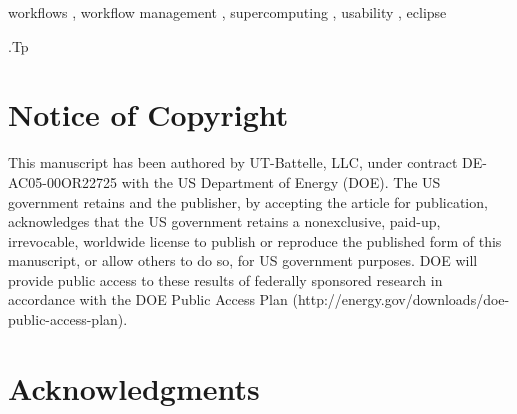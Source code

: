 \documentclass{elsart}
\begin{document}
\begin{frontmatter}
\begin{abstract}
\end{abstract}

\begin{keyword}
workflows
\sep 
workflow management
\sep
supercomputing
\sep
usability
\sep
eclipse

\vspace{1ex}

.Tp %

\end{keyword}

\end{frontmatter}

\section*{Notice of Copyright}

This manuscript has been authored by UT-Battelle, LLC, under contract
DE-AC05-00OR22725 with the US Department of Energy (DOE). The US government
retains and the publisher, by accepting the article for publication,
acknowledges that the US government retains a nonexclusive, paid-up,
irrevocable, worldwide license to publish or reproduce the published form of
this manuscript, or allow others to do so, for US government purposes. DOE will
provide public access to these results of federally sponsored research in
accordance with the DOE Public Access Plan
(http://energy.gov/downloads/doe-public-access-plan).


\section*{Acknowledgments}\label{acknowledgments}




\end{document}
